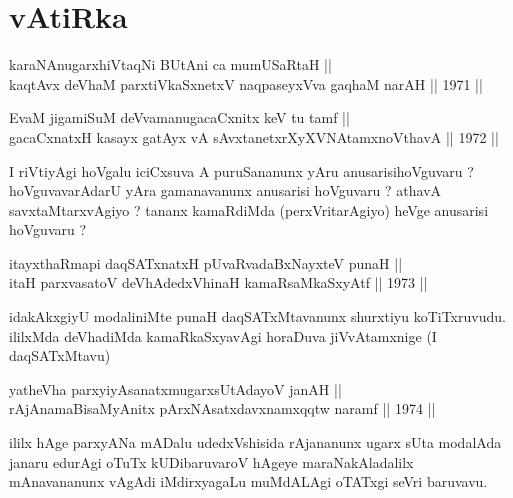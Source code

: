 \section*{vAtiRka}

\begin{shl}
karaNAnugarxhiVtaqNi BUtAni ca mumUSaRtaH || \\
kaqtAvx deVhaM parxtiVkaSxnetxV naqpaseyxVva gaqhaM narAH \hfill || 1971 ||
  
\end{shl}



\begin{shl}
EvaM jigamiSuM deVvamanugacaCxnitx keV tu tamf || \\
gacaCxnatxH kasayx gatAyx vA sAvxtanetxrXyXVNA\s \s tamxnoV\s thavA \hfill || 1972 ||
  
\end{shl}

\begin{artha}
I riVtiyAgi hoVgalu iciCxsuva A puruSananunx yAru anusarisihoVguvaru ?
hoVguvavarAdarU yAra gamanavanunx anusarisi hoVguvaru ? athavA
savxtaMtarxvAgiyo ? tananx kamaRdiMda (perxVritarAgiyo) heVge
anusarisi hoVguvaru ?
\end{artha}

\begin{shl}
itayxthaRmapi daqSATxnatxH pUvaRvadaBxNayxteV punaH || \\
itaH parxvasatoV deVhAdedxVhinaH kamaRsaMkaSxyAtf \hfill || 1973 ||
  
\end{shl}

\begin{artha}
idakAkxgiyU modaliniMte punaH daqSATxMtavanunx shurxtiyu koTiTxruvudu. ililxMda deVhadiMda kamaRkaSxyavAgi horaDuva jiVvAtamxnige (I daqSATxMtavu)
\end{artha}


\begin{shl}
yatheVha parxyiyAsanatxmugarxsUtAdayoV janAH || \\
rAjAnamaBisaMyAnitx pArxNAsatxdavxnamxqqtw naramf \hfill || 1974 ||
  
\end{shl}

\begin{artha}
ililx hAge parxyANa mADalu udedxVshisida rAjananunx ugarx sUta
modalAda janaru edurAgi oTuTx kUDibaruvaroV hAgeye maraNakAladalilx
mAnavananunx vAgAdi iMdirxyagaLu muMdALAgi oTATxgi seVri baruvavu.
\end{artha}

